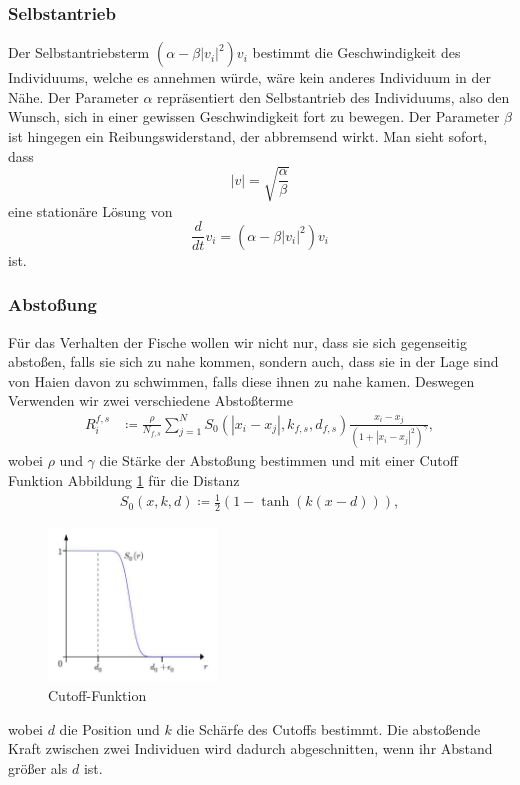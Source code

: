 \documentclass[a4paper,11pt]{article}
\theoremstyle{definition}
\numberwithin{equation}{section}
\begin{document}
	\subsubsection{Selbstantrieb}	
		Der Selbstantriebsterm $(\alpha - \beta |v_i|^2)v_i$ bestimmt die Geschwindigkeit des Individuums, welche es annehmen würde, wäre kein anderes Individuum in der Nähe. Der Parameter $\alpha$ repräsentiert den Selbstantrieb des Individuums, also den Wunsch, sich
in einer gewissen Geschwindigkeit fort zu bewegen. Der Parameter $\beta$ ist hingegen ein Reibungswiderstand, der abbremsend wirkt.
		Man sieht sofort, dass
		\begin{equation}
		|v| = \sqrt{\frac{\alpha}{\beta}}
		\end{equation}
		eine stationäre Lösung von 
	\begin{equation}
		\frac{d}{dt}v_i = (\alpha - \beta |v_i|^2)v_i
		\end{equation}
		ist.
	\subsubsection{Abstoßung}
	Für das Verhalten der Fische wollen wir nicht nur, dass sie sich gegenseitig abstoßen, falls sie sich zu nahe kommen, sondern auch, dass sie in der Lage sind von Haien davon zu schwimmen, falls diese ihnen zu nahe kamen. Deswegen Verwenden wir zwei verschiedene Abstoßterme
	\begin{align*}
		R^{f,s}_i &\coloneqq \frac{\rho}{N_{f,s}}\sum^N_{j=1} S_0(|x_i-x_j|, k_{f,s}, d_{f,s})\frac{x_i-x_j}{\left(1+|x_i-x_j|^2\right)^{\gamma}},
	\end{align*}
	wobei $\rho$ und $\gamma$ die Stärke der Abstoßung bestimmen und mit einer Cutoff Funktion Abbildung \ref{fig:cutoff} für die Distanz
	\begin{align*}
		S_0(x, k, d) \coloneqq \frac{1}{2}(1-\tanh(k(x-d))),
	\end{align*}
	\begin{figure}
	\centering
	\includegraphics[width=0.4\textwidth]{pictures/cutoff.png}
		\caption{Cutoff-Funktion \cite{agueh2011analysis}}
		\label{fig:cutoff}
	\end{figure}
	wobei $d$ die Position und $k$ die Schärfe des Cutoffs bestimmt. 
Die abstoßende Kraft zwischen zwei Individuen wird dadurch abgeschnitten, wenn ihr Abstand größer als $d$ ist.
\end{document}
